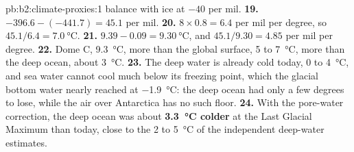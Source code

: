 \begin{solution}{pb:b2:climate-proxies:1}
balance with ice at $-40$ per mil.
\textbf{19.} $-396.6 - (-441.7) = 45.1$ per mil.
\textbf{20.} $8 \times 0.8 = 6.4$ per mil per degree, so $45.1/6.4 = \qty{7.0}{\celsius}$.
\textbf{21.} $9.39 - 0.09 = \qty{9.30}{\celsius}$, and $45.1/9.30 = 4.85$ per mil per degree.
\textbf{22.} Dome C, \qty{9.3}{\celsius}, more than the global surface, 5 to \qty{7}{\celsius}, more
than the deep ocean, about \qty{3}{\celsius}.
\textbf{23.} The deep water is already cold today, 0 to \qty{4}{\celsius}, and sea water cannot
cool much below its freezing point, which the glacial bottom water nearly reached at
\qty{-1.9}{\celsius}: the deep ocean had only a few degrees to lose, while the air over Antarctica
has no such floor.
\textbf{24.} With the pore-water correction, the deep ocean was about \textbf{\qty{3.3}{\celsius}
colder} at the Last Glacial Maximum than today, close to the 2 to \qty{5}{\celsius} of the
independent deep-water estimates.
\end{solution}
